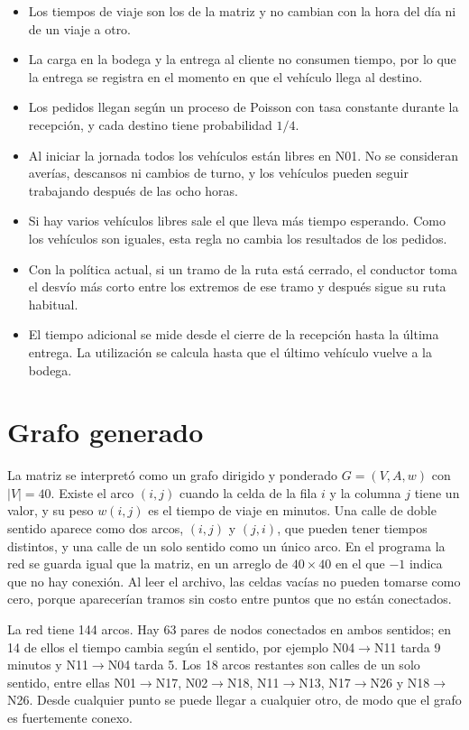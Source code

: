 \documentclass[11pt,letterpaper]{article}
\begin{document}
\begin{itemize}
  \item Los tiempos de viaje son los de la matriz y no cambian con la hora del día ni de un viaje a otro.
  \item La carga en la bodega y la entrega al cliente no consumen tiempo, por lo que la entrega se registra en el momento en que el vehículo llega al destino.
  \item Los pedidos llegan según un proceso de Poisson con tasa constante durante la recepción, y cada destino tiene probabilidad $1/4$.
  \item Al iniciar la jornada todos los vehículos están libres en N01. No se consideran averías, descansos ni cambios de turno, y los vehículos pueden seguir trabajando después de las ocho horas.
  \item Si hay varios vehículos libres sale el que lleva más tiempo esperando. Como los vehículos son iguales, esta regla no cambia los resultados de los pedidos.
  \item Con la política actual, si un tramo de la ruta está cerrado, el conductor toma el desvío más corto entre los extremos de ese tramo y después sigue su ruta habitual.
  \item El tiempo adicional se mide desde el cierre de la recepción hasta la última entrega. La utilización se calcula hasta que el último vehículo vuelve a la bodega.
\end{itemize}

\section{Grafo generado}

La matriz se interpretó como un grafo dirigido y ponderado $G=(V,A,w)$ con $|V|=40$. Existe el arco $(i,j)$ cuando la celda de la fila $i$ y la columna $j$ tiene un valor, y su peso $w(i,j)$ es el tiempo de viaje en minutos. Una calle de doble sentido aparece como dos arcos, $(i,j)$ y $(j,i)$, que pueden tener tiempos distintos, y una calle de un solo sentido como un único arco. En el programa la red se guarda igual que la matriz, en un arreglo de $40\times 40$ en el que $-1$ indica que no hay conexión. Al leer el archivo, las celdas vacías no pueden tomarse como cero, porque aparecerían tramos sin costo entre puntos que no están conectados.

La red tiene 144 arcos. Hay 63 pares de nodos conectados en ambos sentidos; en 14 de ellos el tiempo cambia según el sentido, por ejemplo N04$\rightarrow$N11 tarda 9 minutos y N11$\rightarrow$N04 tarda 5. Los 18 arcos restantes son calles de un solo sentido, entre ellas N01$\rightarrow$N17, N02$\rightarrow$N18, N11$\rightarrow$N13, N17$\rightarrow$N26 y N18$\rightarrow$N26. Desde cualquier punto se puede llegar a cualquier otro, de modo que el grafo es fuertemente conexo.
\end{document}
